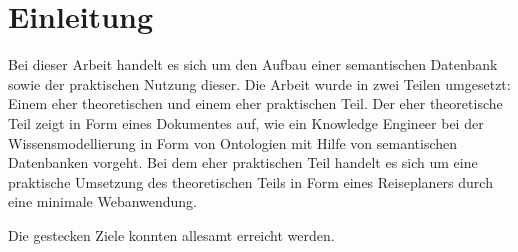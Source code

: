 \chapter{Einleitung}
\label{chap:einleitung}

Bei dieser Arbeit handelt es sich um den Aufbau einer semantischen Datenbank sowie der praktischen Nutzung dieser. Die Arbeit wurde in zwei Teilen umgesetzt: Einem eher theoretischen und einem eher praktischen Teil. Der eher theoretische Teil zeigt in Form eines Dokumentes auf, wie ein Knowledge Engineer bei der Wissensmodellierung in Form von Ontologien mit Hilfe von semantischen Datenbanken vorgeht. Bei dem eher praktischen Teil handelt es sich um eine praktische Umsetzung des theoretischen Teils in Form eines Reiseplaners durch eine minimale Webanwendung.

Die gestecken Ziele konnten allesamt erreicht werden.


